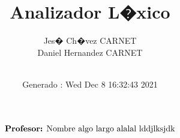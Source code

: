 \documentclass[letterpaper,twoside,12pt]{article}
\title{Analizador L�xico}
\date {Generado : Wed Dec  8 16:32:43 2021
}\author{Jes� Ch�vez CARNET \\  Daniel Hernandez CARNET \\ \\}
\begin{document}
\begin{titlepage}
\maketitle
\sffamily
\begin{align*}
\text{\textbf{Profesor:} Nombre algo largo alalal lddjlksjdk} \\ 
\end{align*}
\end{titlepage}
\end{document}
